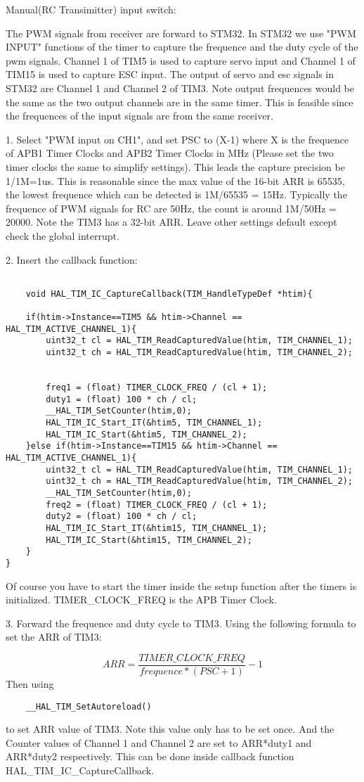 \documentclass{article}
\begin{document}
Manual(RC Transimitter) input switch:

The PWM signals from receiver are forward to STM32. In STM32 we use "PWM INPUT" functions of the timer to capture the frequence and the duty cycle of the pwm signals. Channel 1 of TIM5 is used to capture servo input and Channel 1 of TIM15 is used to capture ESC input. The output of servo and esc signals in STM32 are Channel 1 and Channel 2 of TIM3. Note output frequences would be the same as the two output channels are in the same timer. This is feasible since the frequences of the input signals are from the same receiver.



1. Select "PWM input on CH1", and set PSC to (X-1) where X is the frequence of APB1 Timer Clocks and APB2 Timer Clocks in MHz (Please set the two timer clocks the same to simplify settings). This leads the capture precision be 1/1M=1us. This is reasonable since the max value of the 16-bit ARR is 65535, the lowest frequence which can be detected is 1M/65535 = 15Hz. Typically the frequence of PWM signals for RC are 50Hz, the count is around 1M/50Hz = 20000. Note the TIM3 has a 32-bit ARR. 
Leave other settings default except check the global interrupt.

2. Insert the callback function:
\begin{lstlisting}

    void HAL_TIM_IC_CaptureCallback(TIM_HandleTypeDef *htim){

	if(htim->Instance==TIM5 && htim->Channel == HAL_TIM_ACTIVE_CHANNEL_1){
		uint32_t cl = HAL_TIM_ReadCapturedValue(htim, TIM_CHANNEL_1);
		uint32_t ch = HAL_TIM_ReadCapturedValue(htim, TIM_CHANNEL_2);


		freq1 = (float) TIMER_CLOCK_FREQ / (cl + 1);
		duty1 = (float) 100 * ch / cl;
		__HAL_TIM_SetCounter(htim,0);
		HAL_TIM_IC_Start_IT(&htim5, TIM_CHANNEL_1);
		HAL_TIM_IC_Start(&htim5, TIM_CHANNEL_2);
	}else if(htim->Instance==TIM15 && htim->Channel == HAL_TIM_ACTIVE_CHANNEL_1){
		uint32_t cl = HAL_TIM_ReadCapturedValue(htim, TIM_CHANNEL_1);
		uint32_t ch = HAL_TIM_ReadCapturedValue(htim, TIM_CHANNEL_2);
		__HAL_TIM_SetCounter(htim,0);
		freq2 = (float) TIMER_CLOCK_FREQ / (cl + 1);
		duty2 = (float) 100 * ch / cl;
		HAL_TIM_IC_Start_IT(&htim15, TIM_CHANNEL_1);
		HAL_TIM_IC_Start(&htim15, TIM_CHANNEL_2);
	}
}
\end{lstlisting}


Of course you have to start the timer inside the setup function after the timers is initialized. TIMER\_CLOCK\_FREQ is the APB Timer Clock.

3. Forward the frequence and duty cycle to TIM3. Using the following formula to set the ARR of TIM3:

\begin{equation}
    ARR = \frac{TIMER\_CLOCK\_FREQ}{frequence*(PSC+1)}-1
\end{equation}
Then using
\begin{lstlisting}
    __HAL_TIM_SetAutoreload()
\end{lstlisting} to set ARR value of TIM3.
Note this value only has to be set once.
And the Counter values of Channel 1 and Channel 2 are set to ARR*duty1 and ARR*duty2 respectively. This can be done inside callback function HAL\_TIM\_IC\_CaptureCallback.
\end{document}
